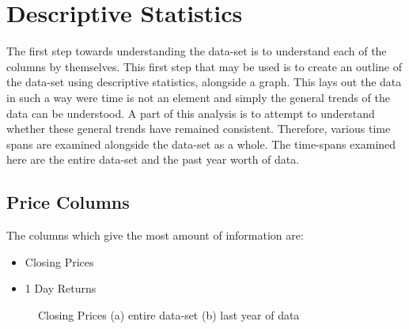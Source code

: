 \section{Descriptive Statistics}

The first step towards understanding the data-set is to understand each of the columns by themselves. This first step that may be used is to create an outline of the data-set using descriptive statistics, alongside a graph. This lays out the data in such a way were time is not an element and simply the general trends of the data can be understood. A part of this analysis is to attempt to understand whether these general trends have remained consistent. Therefore, various time spans are examined alongside the data-set as a whole. The time-spans examined here are the entire data-set and the past year worth of data.

\subsection{Price Columns}

The columns which give the most amount of information are:
\begin{itemize}
    \item Closing Prices
    \item 1 Day Returns
\end{itemize}

\begin{figure}[h!]
    \centering
    \caption{Closing Prices (a) entire data-set (b) last year of data}
    \label{fig:closeDesc}
\end{figure}

